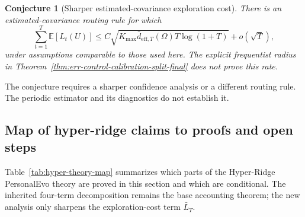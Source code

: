 \documentclass{article} %
\newtheorem{conjecture}{Conjecture}
\begin{document}
\begin{conjecture}[Sharper estimated-covariance exploration cost]
\label{conj:err-control}
There is an estimated-covariance routing rule for which
\begin{equation}
\label{eq:hyper-conj-err}
\sum_{t=1}^{T}\mathbb{E}[L_t(U)]
\le C\sqrt{
K_{\max}\bar d_{\mathrm{eff},T}(\Omega)T\log(1+T)}
+ o(\sqrt{T}),
\end{equation}
under assumptions comparable to those used here. The explicit frequentist
radius in Theorem~\ref{thm:err-control-calibration-split-final} does not prove
this rate.
\end{conjecture}

The conjecture requires a sharper confidence analysis or a different routing
rule. The periodic estimator and its diagnostics do not establish it.

\subsection{Map of hyper-ridge claims to proofs and open steps}
\label{sec:theory-hyper-map}

Table~\ref{tab:hyper-theory-map} summarizes which parts of the Hyper-Ridge PersonalEvo theory are proved in this section and which are conditional.  The inherited four-term decomposition remains the base accounting theorem; the new analysis only sharpens the exploration-cost term \(\bar L_T\).
\end{document}
